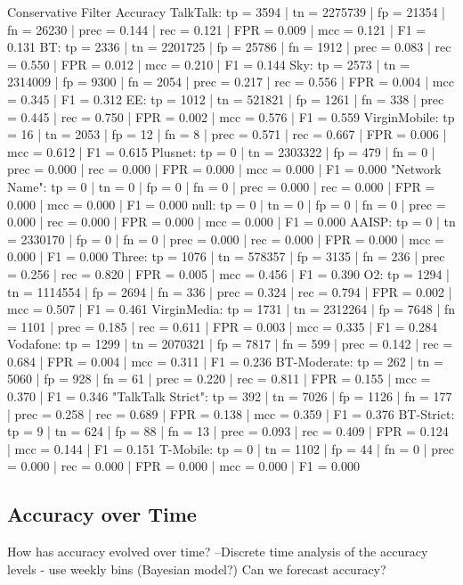 \documentclass{bmcart}
\begin{document}
Conservative Filter Accuracy
TalkTalk: tp = 3594 | tn = 2275739 | fp = 21354 | fn = 26230 | prec = 0.144 | rec = 0.121 | FPR = 0.009 | mcc = 0.121 | F1 = 0.131
BT: tp = 2336 | tn = 2201725 | fp = 25786 | fn = 1912 | prec = 0.083 | rec = 0.550 | FPR = 0.012 | mcc = 0.210 | F1 = 0.144
Sky: tp = 2573 | tn = 2314009 | fp = 9300 | fn = 2054 | prec = 0.217 | rec = 0.556 | FPR = 0.004 | mcc = 0.345 | F1 = 0.312
EE: tp = 1012 | tn = 521821 | fp = 1261 | fn = 338 | prec = 0.445 | rec = 0.750 | FPR = 0.002 | mcc = 0.576 | F1 = 0.559
VirginMobile: tp = 16 | tn = 2053 | fp = 12 | fn = 8 | prec = 0.571 | rec = 0.667 | FPR = 0.006 | mcc = 0.612 | F1 = 0.615
Plusnet: tp = 0 | tn = 2303322 | fp = 479 | fn = 0 | prec = 0.000 | rec = 0.000 | FPR = 0.000 | mcc = 0.000 | F1 = 0.000
"Network Name": tp = 0 | tn = 0 | fp = 0 | fn = 0 | prec = 0.000 | rec = 0.000 | FPR = 0.000 | mcc = 0.000 | F1 = 0.000
null: tp = 0 | tn = 0 | fp = 0 | fn = 0 | prec = 0.000 | rec = 0.000 | FPR = 0.000 | mcc = 0.000 | F1 = 0.000
AAISP: tp = 0 | tn = 2330170 | fp = 0 | fn = 0 | prec = 0.000 | rec = 0.000 | FPR = 0.000 | mcc = 0.000 | F1 = 0.000
Three: tp = 1076 | tn = 578357 | fp = 3135 | fn = 236 | prec = 0.256 | rec = 0.820 | FPR = 0.005 | mcc = 0.456 | F1 = 0.390
O2: tp = 1294 | tn = 1114554 | fp = 2694 | fn = 336 | prec = 0.324 | rec = 0.794 | FPR = 0.002 | mcc = 0.507 | F1 = 0.461
VirginMedia: tp = 1731 | tn = 2312264 | fp = 7648 | fn = 1101 | prec = 0.185 | rec = 0.611 | FPR = 0.003 | mcc = 0.335 | F1 = 0.284
Vodafone: tp = 1299 | tn = 2070321 | fp = 7817 | fn = 599 | prec = 0.142 | rec = 0.684 | FPR = 0.004 | mcc = 0.311 | F1 = 0.236
BT-Moderate: tp = 262 | tn = 5060 | fp = 928 | fn = 61 | prec = 0.220 | rec = 0.811 | FPR = 0.155 | mcc = 0.370 | F1 = 0.346
"TalkTalk Strict": tp = 392 | tn = 7026 | fp = 1126 | fn = 177 | prec = 0.258 | rec = 0.689 | FPR = 0.138 | mcc = 0.359 | F1 = 0.376
BT-Strict: tp = 9 | tn = 624 | fp = 88 | fn = 13 | prec = 0.093 | rec = 0.409 | FPR = 0.124 | mcc = 0.144 | F1 = 0.151
T-Mobile: tp = 0 | tn = 1102 | fp = 44 | fn = 0 | prec = 0.000 | rec = 0.000 | FPR = 0.000 | mcc = 0.000 | F1 = 0.000


\subsection*{Accuracy over Time}
How has accuracy evolved over time?
--Discrete time analysis of the accuracy levels - use weekly bins (Bayesian model?) Can we forecast accuracy?
\end{document}
